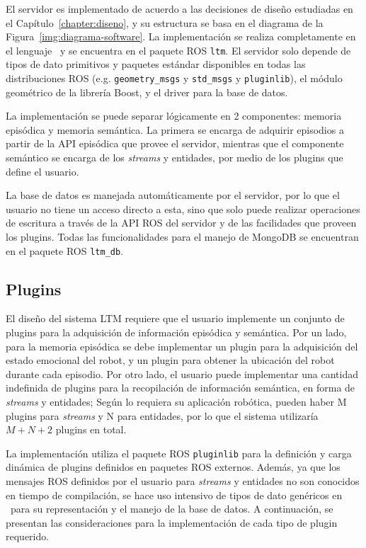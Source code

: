 El servidor es implementado de acuerdo a las decisiones de diseño estudiadas en el Capítulo~\ref{chapter:diseno}, y su estructura se basa en el diagrama de la Figura~\ref{img:diagrama-software}. La implementación se realiza completamente en el lenguaje \CC \ y se encuentra en el paquete ROS \texttt{ltm}. El servidor solo depende de tipos de dato primitivos y paquetes estándar disponibles en todas las distribuciones ROS (e.g. \texttt{geometry\_msgs} y \texttt{std\_msgs} y \texttt{pluginlib}), el módulo geométrico de la librería Boost, y el driver para la base de datos. 

La implementación se puede separar lógicamente en 2 componentes: memoria episódica y memoria semántica. La primera se encarga de adquirir episodios a partir de la API episódica que provee el servidor, mientras que el componente semántico se encarga de los \textit{streams} y entidades, por medio de los plugins que define el usuario.

La base de datos es manejada automáticamente por el servidor, por lo que el usuario no tiene un acceso directo a esta, sino que solo puede realizar operaciones de escritura a través de la API ROS del servidor y de las facilidades que proveen los plugins. Todas las funcionalidades para el manejo de MongoDB se encuentran en el paquete ROS \texttt{ltm\_db}.


\subsection{Plugins}

El diseño del sistema LTM requiere que el usuario implemente un conjunto de plugins para la adquisición de información episódica y semántica. Por un lado, para la memoria episódica se debe implementar un plugin para la adquisición del estado emocional del robot, y un plugin para obtener la ubicación del robot durante cada episodio. Por otro lado, el usuario puede implementar una cantidad indefinida de plugins para la recopilación de información semántica, en forma de \textit{streams} y entidades; Según lo requiera su aplicación robótica, pueden haber M plugins para \textit{streams} y N para entidades, por lo que el sistema utilizaría $M + N + 2$ plugins en total.

La implementación utiliza el paquete ROS \texttt{pluginlib} para la definición y carga dinámica de plugins definidos en paquetes ROS externos. Además, ya que los mensajes ROS definidos por el usuario para \textit{streams} y entidades no son conocidos en tiempo de compilación, se hace uso intensivo de tipos de dato genéricos en \CC \ para su representación y el manejo de la base de datos. A continuación, se presentan las consideraciones para la implementación de cada tipo de plugin requerido.


